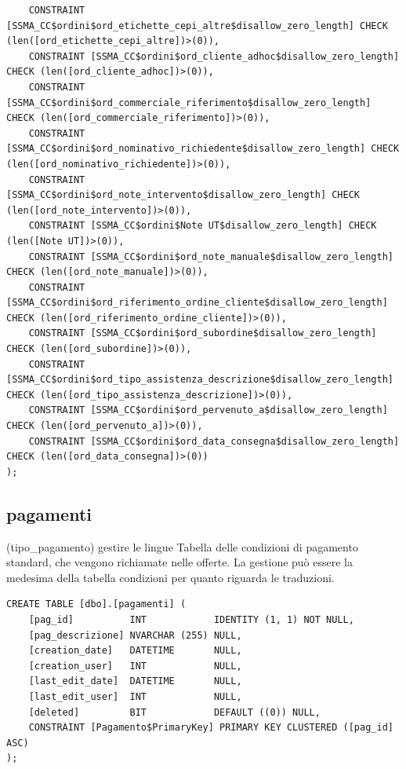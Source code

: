 \documentclass[12pt]{article}
\begin{document}
\begin{lstlisting}
    CONSTRAINT [SSMA_CC$ordini$ord_etichette_cepi_altre$disallow_zero_length] CHECK (len([ord_etichette_cepi_altre])>(0)),
    CONSTRAINT [SSMA_CC$ordini$ord_cliente_adhoc$disallow_zero_length] CHECK (len([ord_cliente_adhoc])>(0)),
    CONSTRAINT [SSMA_CC$ordini$ord_commerciale_riferimento$disallow_zero_length] CHECK (len([ord_commerciale_riferimento])>(0)),
    CONSTRAINT [SSMA_CC$ordini$ord_nominativo_richiedente$disallow_zero_length] CHECK (len([ord_nominativo_richiedente])>(0)),
    CONSTRAINT [SSMA_CC$ordini$ord_note_intervento$disallow_zero_length] CHECK (len([ord_note_intervento])>(0)),
    CONSTRAINT [SSMA_CC$ordini$Note UT$disallow_zero_length] CHECK (len([Note UT])>(0)),
    CONSTRAINT [SSMA_CC$ordini$ord_note_manuale$disallow_zero_length] CHECK (len([ord_note_manuale])>(0)),
    CONSTRAINT [SSMA_CC$ordini$ord_riferimento_ordine_cliente$disallow_zero_length] CHECK (len([ord_riferimento_ordine_cliente])>(0)),
    CONSTRAINT [SSMA_CC$ordini$ord_subordine$disallow_zero_length] CHECK (len([ord_subordine])>(0)),
    CONSTRAINT [SSMA_CC$ordini$ord_tipo_assistenza_descrizione$disallow_zero_length] CHECK (len([ord_tipo_assistenza_descrizione])>(0)),
    CONSTRAINT [SSMA_CC$ordini$ord_pervenuto_a$disallow_zero_length] CHECK (len([ord_pervenuto_a])>(0)),
    CONSTRAINT [SSMA_CC$ordini$ord_data_consegna$disallow_zero_length] CHECK (len([ord_data_consegna])>(0))
);
\end{lstlisting}

\subsection{pagamenti}(tipo\_pagamento) gestire le lingue
Tabella delle condizioni di pagamento standard, che vengono richiamate nelle offerte.
La gestione può essere la medesima della tabella condizioni per quanto riguarda le traduzioni.
\begin{lstlisting}
CREATE TABLE [dbo].[pagamenti] (
    [pag_id]          INT            IDENTITY (1, 1) NOT NULL,
    [pag_descrizione] NVARCHAR (255) NULL,
    [creation_date]   DATETIME       NULL,
    [creation_user]   INT            NULL,
    [last_edit_date]  DATETIME       NULL,
    [last_edit_user]  INT            NULL,
    [deleted]         BIT            DEFAULT ((0)) NULL,
    CONSTRAINT [Pagamento$PrimaryKey] PRIMARY KEY CLUSTERED ([pag_id] ASC)
);
\end{lstlisting}
\end{document}
